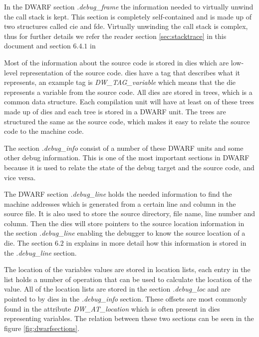 In the \gls{DWARF} section \emph{.debug\_frame} the information needed to virtually unwind the call stack is kept.
This section is completely self-contained and is made up of two structures called \acrfull{cie} and \acrfull{fde}.
Virtually unwinding the call stack is complex, thus for further details we refer the reader section \ref{sec:stacktrace} in this document and section $6.4.1$ in \cite{dwarf}


Most of the information about the source code is stored in \glspl{die} which are low-level representation of the source code.
\glspl{die} have a tag that describes what it represents, an example tag is \emph{DW\_TAG\_variable} which means that the \gls{die} represents a variable from the source code.
All \glspl{die} are stored in trees, which is a common data structure.
Each compilation unit will have at least on of these trees made up of \glspl{die} and each tree is stored in a \gls{DWARF} unit.
The trees are structured the same as the source code, which makes it easy to relate the source code to the machine code.

The section \emph{.debug\_info} consist of a number of these \gls{DWARF} units and some other debug information.
This is one of the most important sections in \gls{DWARF} because it is used to relate the state of the debug target and the source code, and vice versa.


The \gls{DWARF} section \emph{.debug\_line} holds the needed information to find the machine addresses which is generated from a certain line and column in the source file.
It is also used to store the source directory, file name, line number and column.
Then the \glspl{die} will store pointers to the source location information in the section \emph{.debug\_line} enabling the debugger to know the source location of a \gls{die}.
The section $6.2$ in \cite{dwarf} explains in more detail how this information is stored in the \emph{.debug\_line} section.


The location of the variables values are stored in location lists, each entry in the list holds a number of operation that can be used to calculate the location of the value.
All of the location lists are stored in the section \emph{.debug\_loc} and are pointed to by \glspl{die} in the \emph{.debug\_info} section.
These offsets are most commonly found in the attribute \emph{DW\_AT\_location} which is often present in \glspl{die} representing variables.
The relation between these two sections can be seen in the figure \ref{fig:dwarfsections}.



